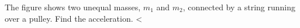         The figure shows two unequal masses, $m_1$ and $m_2$, connected by
        a string running over a pulley. Find the acceleration.
        <%
